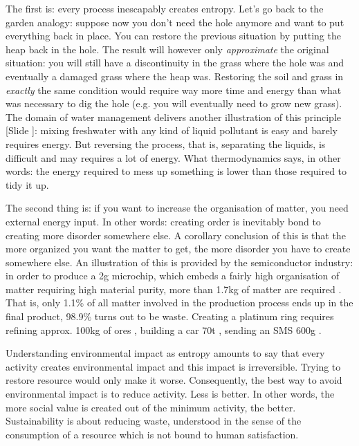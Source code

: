 \documentclass{article}
\newcounter{slide}
\begin{document}
The first is: every process inescapably creates entropy. Let's go back to the garden analogy: suppose now you don't need the hole anymore and want to put everything back in place. You can restore the previous situation by putting the heap back in the hole. The result will however only \emph{approximate} the original situation: you will still have a discontinuity in the grass where the hole was and eventually a damaged grass where the heap was. Restoring the soil and grass in \emph{exactly} the same condition would require way more time and energy than what was necessary to dig the hole (e.g. you will eventually need to grow new grass). The domain of water management delivers another illustration of this principle {\color{blue}[Slide ]}: mixing freshwater with any kind of liquid pollutant is easy and barely requires energy. But reversing the process, that is, separating the liquids, is difficult and may requires a lot of energy. What thermodynamics says, in other words: the energy required to mess up something is lower than those required to tidy it up.

The second thing is: if you want to increase the organisation of matter, you need external energy input. In other words: creating order is inevitably bond to creating more disorder somewhere else. A corollary conclusion of this is that the more organized you want the matter to get, the more disorder you have to create somewhere else. An illustration of this is provided by the semiconductor industry: in order to produce a 2g microchip, which embeds a fairly high organisation of matter requiring high material purity, more than 1.7kg of matter are required \cite{williamsKilogramMicrochipEnergy2002}. That is, only 1.1\% of all matter involved in the production process ends up in the final product, 98.9\% turns out to be waste. Creating a platinum ring requires refining approx. 100kg of ores \cite{erkmanVersEcologieIndustrielle2004}, building a car 70t \cite{janinDemarcheEcoconceptionEntreprise2000}, sending an SMS 600g \cite{federico2001mips}.

Understanding environmental impact as entropy amounts to say that every activity creates environmental impact and this impact is irreversible. Trying to restore resource would only make it worse. Consequently, the best way to avoid environmental impact is to reduce activity. Less is better. In other words, the more social value is created out of the minimum activity, the better. Sustainability is about reducing waste, understood in the sense of the consumption of a resource which is not bound to human satisfaction.
\end{document}
